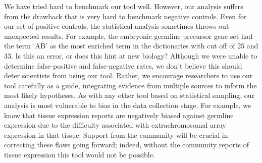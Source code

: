 \documentclass[linenumbers, doublespacing]{bmcart}
\begin{document}
We have tried hard to benchmark our tool well. However, our analysis suffers from the drawback that is very hard to benchmark negative controls. Even for our set of positive controls, the statistical analysis sometimes throws out unexpected results. For example, the embryonic germline precursor gene set had the term `AB' as the most enriched term in the dictionaries with cut off of 25 and 33. Is this an error, or does this hint at new biology? Although we were unable to determine false-positive and false-negative rates, we don't believe this should deter scientists from using our tool. Rather, we encourage researchers to use our tool carefully as a guide, integrating evidence from multiple sources to inform the most likely hypotheses. As with any other tool based on statistical sampling, our analysis is most vulnerable to bias in the data collection stage. For example, we know that tissue expression reports are negatively biased against germline expression due to the difficulty associated with extrachromosomal array expression in that tissue. Support from the community will be crucial in correcting these flaws going forward; indeed, without the community reports of tissue expression this tool would not be possible. 


\end{document}
